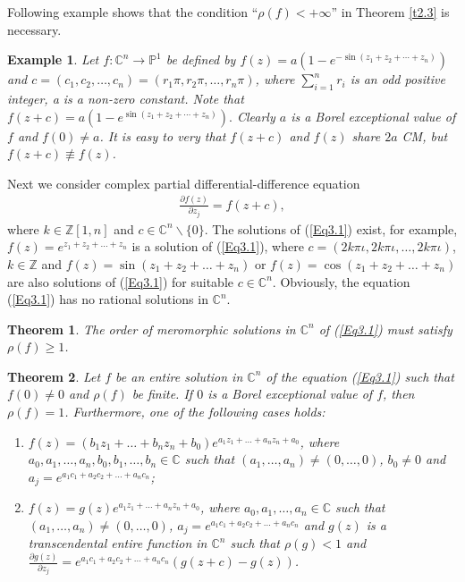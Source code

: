 \documentclass[11pt,reqno]{amsart}
\newtheorem{theo}{Theorem}[section]
\newtheorem{exm}{Example}[section]
\numberwithin{equation}{section}
\begin{document}
Following example shows that the condition ``$\rho(f)<+\infty$'' in Theorem \ref{t2.3} is necessary.
\begin{exm} Let $f:\mathbb{C}^n\rightarrow \mathbb{P}^1$ be defined by $\displaystyle f(z)=a\left(1-e^{-\sin(z_1+z_2+\cdots+z_n)}\right)$
and $c=(c_1,c_2,\ldots,c_n)=(r_1\pi,r_2\pi,\ldots,r_n\pi)$, where $\sum_{i=1}^nr_i$ is an odd positive integer, a is a non-zero constant. Note that
$\displaystyle f(z+c)=a\left(1-e^{\sin(z_1+z_2+\cdots+z_n)}\right).$
 Clearly $a$ is a Borel exceptional value of $f$ and $f(0)\neq a $. It is easy to very that $f(z+c)$ and $f(z)$ share $2a$ CM, but $f(z+c)\not\equiv f(z)$.
\end{exm}

Next we consider complex partial differential-difference equation
\begin{align}\label{Eq3.1}
\frac{\partial f(z)}{\partial z_j}=f(z+c),
\end{align}
where $k\in\mathbb{Z}[1,n]$ and $c\in\mathbb{C}^n\backslash \{0\}$.
The solutions of (\ref{Eq3.1}) exist, for example, $f(z)=e^{z_1+z_2+\ldots+z_n}$ is a solution of (\ref{Eq3.1}), where
$c =(2k\pi \iota,2k\pi \iota,\ldots,2k\pi \iota)$, $k\in\mathbb{Z}$ and $f(z)=\sin (z_1+z_2+\ldots+z_n)$ or $f(z)=\cos (z_1+z_2+\ldots+z_n)$ are also solutions of (\ref{Eq3.1}) for suitable $c\in\mathbb{C}^n$. Obviously, the equation
(\ref{Eq3.1}) has no rational solutions in $\mathbb{C}^n$.

\begin{theo}\label{t2.4} The order of meromorphic solutions in $\mathbb{C}^n$ of (\ref{Eq3.1}) must satisfy $\rho(f)\geq 1$.
\end{theo}

\begin{theo}\label{t2.5} Let $f$ be an entire solution in $\mathbb{C}^n$ of the equation (\ref{Eq3.1}) such that $f(0)\neq 0$ and $\rho(f)$ be finite. If $0$ is a Borel exceptional value of $f$, then $\rho(f)=1$. Furthermore, one of the following cases holds:
\begin{enumerate}
\item[(i)] $f(z)=(b_1z_1+\ldots+b_nz_n+b_0)e^{a_1z_1+\ldots+a_nz_n+a_0}$, where $a_0,a_1,\ldots,a_n,b_0,b_1,\ldots,b_n\in\mathbb{C}$ such that $(a_1,\ldots,a_n)\neq (0,\ldots,0)$, $b_0\neq 0$ and $a_j=e^{a_1c_1+a_2c_2+\ldots+a_nc_n}$;
\item[(ii)] $f(z)=g(z)e^{a_1z_1+\ldots+a_nz_n+a_0}$, where $a_0,a_1,\ldots,a_n\in\mathbb{C}$ such that $(a_1,\ldots,a_n)\neq (0,\ldots,0)$, $a_j=e^{a_1c_1+a_2c_2+\ldots+a_nc_n}$ and $g(z)$ is a transcendental entire function in $\mathbb{C}^n$ such that $\rho(g)<1$ and $\frac{\partial g(z)}{\partial z_j}=e^{a_1c_1+a_2c_2+\ldots+a_nc_n}(g(z+c)-g(z))$.
\end{enumerate}
\end{theo}
\end{document}
